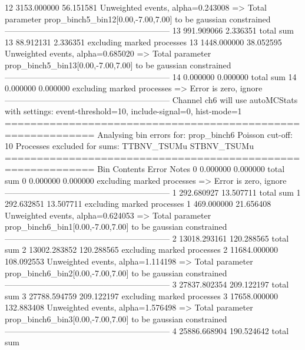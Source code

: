 12         3153.000000     56.151581       Unweighted events, alpha=0.243008
  => Total parameter prop_binch5_bin12[0.00,-7.00,7.00] to be gaussian constrained
------------------------------------------------------------
13         991.909066      2.336351        total sum                     
13         88.912131       2.336351        excluding marked processes    
13         1448.000000     38.052595       Unweighted events, alpha=0.685020
  => Total parameter prop_binch5_bin13[0.00,-7.00,7.00] to be gaussian constrained
------------------------------------------------------------
14         0.000000        0.000000        total sum                     
14         0.000000        0.000000        excluding marked processes    
  => Error is zero, ignore      
------------------------------------------------------------
Channel ch6 will use autoMCStats with settings: event-threshold=10, include-signal=0, hist-mode=1
============================================================
Analysing bin errors for: prop_binch6
Poisson cut-off: 10
Processes excluded for sums: TTBNV_TSUMu STBNV_TSUMu
============================================================
Bin        Contents        Error           Notes                         
0          0.000000        0.000000        total sum                     
0          0.000000        0.000000        excluding marked processes    
  => Error is zero, ignore      
------------------------------------------------------------
1          292.680927      13.507711       total sum                     
1          292.632851      13.507711       excluding marked processes    
1          469.000000      21.656408       Unweighted events, alpha=0.624053
  => Total parameter prop_binch6_bin1[0.00,-7.00,7.00] to be gaussian constrained
------------------------------------------------------------
2          13018.293161    120.288565      total sum                     
2          13002.283852    120.288565      excluding marked processes    
2          11684.000000    108.092553      Unweighted events, alpha=1.114198
  => Total parameter prop_binch6_bin2[0.00,-7.00,7.00] to be gaussian constrained
------------------------------------------------------------
3          27837.802354    209.122197      total sum                     
3          27788.594759    209.122197      excluding marked processes    
3          17658.000000    132.883408      Unweighted events, alpha=1.576498
  => Total parameter prop_binch6_bin3[0.00,-7.00,7.00] to be gaussian constrained
------------------------------------------------------------
4          25886.668904    190.524642      total sum                     
